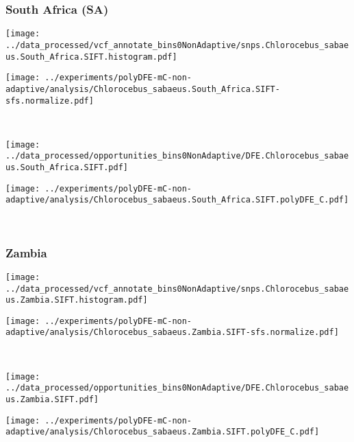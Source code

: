 \subsubsection{South Africa (SA)}

\begin{minipage}{0.49\linewidth}
    \texttt{[image: ../data\_processed/vcf\_annotate\_bins0NonAdaptive/snps.Chlorocebus\_sabaeus.South\_Africa.SIFT.histogram.pdf]}
\end{minipage}
\begin{minipage}{0.49\linewidth}
    \texttt{[image: ../experiments/polyDFE-mC-non-adaptive/analysis/Chlorocebus\_sabaeus.South\_Africa.SIFT-sfs.normalize.pdf]}
\end{minipage}
\\
\begin{minipage}{0.49\linewidth}
    \texttt{[image: ../data\_processed/opportunities\_bins0NonAdaptive/DFE.Chlorocebus\_sabaeus.South\_Africa.SIFT.pdf]}
\end{minipage}
\begin{minipage}{0.49\linewidth}
    \texttt{[image: ../experiments/polyDFE-mC-non-adaptive/analysis/Chlorocebus\_sabaeus.South\_Africa.SIFT.polyDFE\_C.pdf]}
\end{minipage}
\\

\subsubsection{Zambia}

\begin{minipage}{0.49\linewidth}
    \texttt{[image: ../data\_processed/vcf\_annotate\_bins0NonAdaptive/snps.Chlorocebus\_sabaeus.Zambia.SIFT.histogram.pdf]}
\end{minipage}
\begin{minipage}{0.49\linewidth}
    \texttt{[image: ../experiments/polyDFE-mC-non-adaptive/analysis/Chlorocebus\_sabaeus.Zambia.SIFT-sfs.normalize.pdf]}
\end{minipage}
\\
\begin{minipage}{0.49\linewidth}
    \texttt{[image: ../data\_processed/opportunities\_bins0NonAdaptive/DFE.Chlorocebus\_sabaeus.Zambia.SIFT.pdf]}
\end{minipage}
\begin{minipage}{0.49\linewidth}
    \texttt{[image: ../experiments/polyDFE-mC-non-adaptive/analysis/Chlorocebus\_sabaeus.Zambia.SIFT.polyDFE\_C.pdf]}
\end{minipage}
\\

